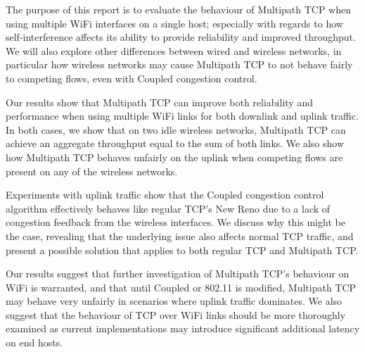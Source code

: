 \documentclass[12pt,a4paper]{article}
\begin{document}
The purpose of this report is to evaluate the behaviour of Multipath TCP when
using multiple WiFi interfaces on a single host; especially with regards to
how self-interference affects its ability to provide reliability and improved
throughput. We will also explore other differences between wired and wireless
networks, in particular how wireless networks may cause Multipath TCP to not
behave fairly to competing flows, even with Coupled congestion control.

Our results show that Multipath TCP can improve both reliability and performance
when using multiple WiFi links for both downlink and uplink traffic. In both
cases, we show that on two idle wireless networks, Multipath TCP can achieve an
aggregate throughput equal to the sum of both links. We also show how Multipath
TCP behaves unfairly on the uplink when competing flows are present on any of
the wireless networks.

Experiments with uplink traffic show that the Coupled congestion control
algorithm effectively behaves like regular TCP's New Reno due to a lack of
congestion feedback from the wireless interfaces. We discuss why this might be
the case, revealing that the underlying issue also affects normal TCP traffic,
and present a possible solution that applies to both regular TCP and Multipath
TCP.

Our results suggest that further investigation of Multipath TCP's behaviour on
WiFi is warranted, and that until Coupled or 802.11 is modified, Multipath TCP
may behave very unfairly in scenarios where uplink traffic dominates. We also
suggest that the behaviour of TCP over WiFi links should be more thoroughly
examined as current implementations may introduce significant additional latency
on end hosts.
\end{document}
